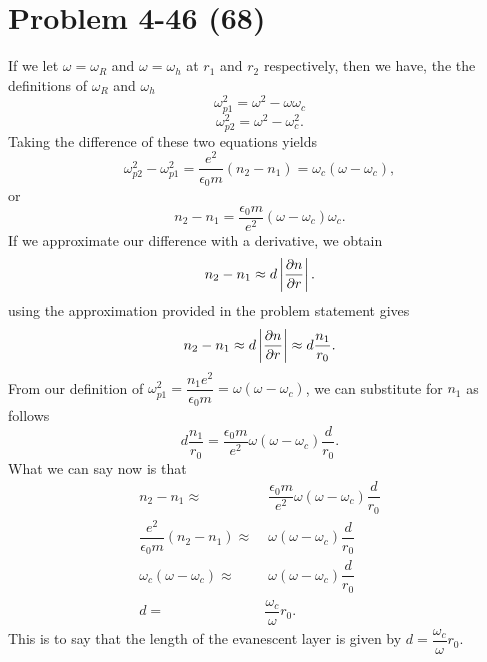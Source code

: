 \section*{Problem 4-46 (68)}
\label{sec:4-46}
If we let \(\omega = \omega_R \) and \(\omega = \omega_h \) at \(r_1\) and \(r_2\) respectively, then we have, the the definitions of \(\omega_R\) and \(\omega_h \)
\begin{equation*}
	\omega_{p1}^2 = \omega^2 - \omega\omega_c
\end{equation*}
\begin{equation*}
	\omega_{p2}^2 = \omega^2 - \omega_c^2.
\end{equation*}
Taking the difference of these two equations yields
\begin{equation*}
	\omega_{p2}^2 - \omega_{p1}^2 = \dfrac{e^2}{\epsilon_0m}\left(n_2 - n_1\right) = \omega_c\left(\omega - \omega_c \right),
\end{equation*}
or
\begin{equation*}
	n_2 - n_1 = \dfrac{\epsilon_0 m}{e^2}\left(\omega - \omega_c\right)\omega_c.
\end{equation*}
If we approximate our difference with a derivative, we obtain
\begin{equation*}
	n_2 - n_1 \approx d\left|\frac{\partial n}{\partial r}\right|.
\end{equation*}
using the approximation provided in the problem statement gives
\begin{equation*}
	n_2 - n_1 \approx d\left|\frac{\partial n}{\partial r}\right| \approx d\dfrac{n_1}{r_0}.
\end{equation*}
From our definition of \(\omega_{p1}^2 = \dfrac{n_1e^2}{\epsilon_0m} = \omega(\omega - \omega_c) \), we can substitute for \(n_1\) as follows
\begin{equation*}
	d\dfrac{n_1}{r_0} = \dfrac{\epsilon_0m}{e^2}\omega(\omega - \omega_c)\dfrac{d}{r_0}.
\end{equation*}
What we can say now is that
\begin{align*}
	n_2 - n_1 \approx& \;\dfrac{\epsilon_0 m }{e^2}\omega(\omega - \omega_c)\dfrac{d}{r_0}\\
	\dfrac{e^2}{\epsilon_0 m }(n_2 - n_1) \approx& \;\omega(\omega - \omega_c)\dfrac{d}{r_0}\\
	\omega_c(\omega - \omega_c) \approx& \;\omega(\omega - \omega_c)\dfrac{d}{r_0}\\
	d =& \dfrac{\omega_c}{\omega}r_0.
\end{align*}
This is to say that the length of the evanescent layer is given by \(d = \dfrac{\omega_c}{\omega}r_0.\)

%
